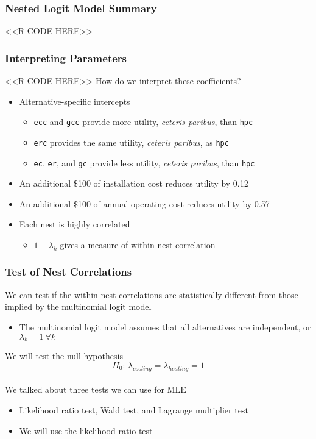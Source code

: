 \documentclass{beamer}
\begin{document}
\begin{frame}[fragile]\frametitle{Nested Logit Model Summary}
	\vspace{1ex}
    <<R CODE HERE>>
\end{frame}

\begin{frame}[fragile]\frametitle{Interpreting Parameters}
    <<R CODE HERE>>
    \vspace{2ex}
    How do we interpret these coefficients?
    \begin{itemize}
    	\item Alternative-specific intercepts
    	\begin{itemize}
    		\item \texttt{ecc} and \texttt{gcc} provide more utility, \emph{ceteris paribus}, than \texttt{hpc}
	        \item \texttt{erc} provides the same utility, \emph{ceteris paribus}, as \texttt{hpc}
	        \item \texttt{ec}, \texttt{er}, and \texttt{gc} provide less utility, \emph{ceteris paribus}, than \texttt{hpc}
    	\end{itemize}
        \item An additional \$100 of installation cost reduces utility by 0.12
        \item An additional \$100 of annual operating cost reduces utility by 0.57
        \item Each nest is highly correlated
        \begin{itemize}
        	\item $1 - \lambda_k$ gives a measure of within-nest correlation
        \end{itemize}
    \end{itemize}
\end{frame}

\begin{frame}\frametitle{Test of Nest Correlations}
    We can test if the within-nest correlations are statistically different from those implied by the multinomial logit model
    \begin{itemize}
    	\item The multinomial logit model assumes that all alternatives are independent, or $\lambda_k = 1 ~\forall k$
    \end{itemize}
    \vspace{3ex}
    We will test the null hypothesis
    $$H_0 \text{: } \lambda_{cooling} = \lambda_{heating} = 1$$ \\
    \vspace{3ex}
    We talked about three tests we can use for MLE
    \begin{itemize}
    	\item Likelihood ratio test, Wald test, and Lagrange multiplier test
    	\item We will use the likelihood ratio test
    \end{itemize}
\end{frame}
\end{document}
